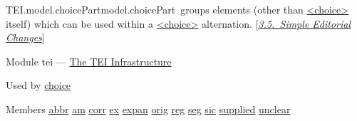 \begin{reflist}
\item[]\begin{specHead}{TEI.model.choicePart}{model.choicePart} groups elements (other than \hyperref[TEI.choice]{<choice>} itself) which can be used within a \hyperref[TEI.choice]{<choice>} alternation. [\textit{\hyperref[COED]{3.5.\ Simple Editorial Changes}}]\end{specHead} 
    \item[{Module}]
  tei — \hyperref[ST]{The TEI Infrastructure}
    \item[{Used by}]
  \hyperref[TEI.choice]{choice}
    \item[{Members}]
  \hyperref[TEI.abbr]{abbr} \hyperref[TEI.am]{am} \hyperref[TEI.corr]{corr} \hyperref[TEI.ex]{ex} \hyperref[TEI.expan]{expan} \hyperref[TEI.orig]{orig} \hyperref[TEI.reg]{reg} \hyperref[TEI.seg]{seg} \hyperref[TEI.sic]{sic} \hyperref[TEI.supplied]{supplied} \hyperref[TEI.unclear]{unclear}
\end{reflist}  
